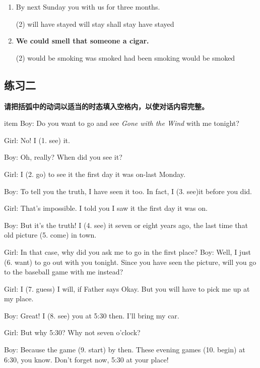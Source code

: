 \begin{enumerate}
\item By next Sunday you \ttu with us for three months.
  \begin{tasks}(2)
    \task will have stayed
    \task will stay
    \task shall stay
    \task have stayed
  \end{tasks}

\item \textbf{We could smell that someone \ttu a cigar.}
  \begin{tasks}(2)
    \task would be smoking
    \task was smoked
    \task had been smoking
    \task would be smoked
  \end{tasks}

\end{enumerate}

\subsection{练习二}

\textbf{请把括弧中的动词以适当的时态填入空格内，以使对话内容完整。}

item Boy: Do you want to go and see \textit{Gone with the Wind} with me tonight?

Girl: No! I \ttu (1. see) it.

Boy: Oh, really? When did you see it?

Girl: I \ttu (2. go) to see it the first day it was on-last Monday.

Boy: To tell you the truth, I have seen it too. In fact, I \ttu (3. see)it before you did.

Girl: That's impossible. I told you I saw it the first day it was on.

Boy: But it's the truth! I \ttu (4. see) it seven or eight years ago, the
last time that old picture \ttu (5. come) in town.


Girl: In that case, why did you ask me to go in the first place? Boy: Well,
I just \ttu (6. want) to go out with you tonight. Since you have seen the
picture, will you go to the baseball game with me instead?

Girl: I \ttu (7. guess) I will, if Father says Okay. But you will have to
pick me up at my place.

Boy: Great! I \ttu (8. see) you at 5:30 then. I'll bring my car.

Girl: But why 5:30? Why not seven o'clock?

Boy: Because the game \ttu (9. start) by then. These evening games \ttu (10.
begin) at 6:30, you know. Don't forget now, 5:30 at your place!

